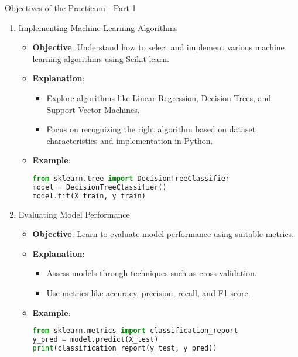 \documentclass[aspectratio=169]{beamer}
\begin{document}
\begin{frame}[fragile]{Objectives of the Practicum - Part 1}
    \begin{enumerate}
        \item Implementing Machine Learning Algorithms
            \begin{itemize}
                \item \textbf{Objective}: Understand how to select and implement various machine learning algorithms using Scikit-learn.
                \item \textbf{Explanation}:
                    \begin{itemize}
                        \item Explore algorithms like Linear Regression, Decision Trees, and Support Vector Machines.
                        \item Focus on recognizing the right algorithm based on dataset characteristics and implementation in Python.
                    \end{itemize}
                \item \textbf{Example}:
                    \begin{lstlisting}[language=Python]
from sklearn.tree import DecisionTreeClassifier
model = DecisionTreeClassifier()
model.fit(X_train, y_train)
                    \end{lstlisting}
            \end{itemize}

        \item Evaluating Model Performance
            \begin{itemize}
                \item \textbf{Objective}: Learn to evaluate model performance using suitable metrics.
                \item \textbf{Explanation}:
                    \begin{itemize}
                        \item Assess models through techniques such as cross-validation.
                        \item Use metrics like accuracy, precision, recall, and F1 score.
                    \end{itemize}
                \item \textbf{Example}:
                    \begin{lstlisting}[language=Python]
from sklearn.metrics import classification_report
y_pred = model.predict(X_test)
print(classification_report(y_test, y_pred))
                    \end{lstlisting}
            \end{itemize}
    \end{enumerate}
\end{frame}
\end{document}
